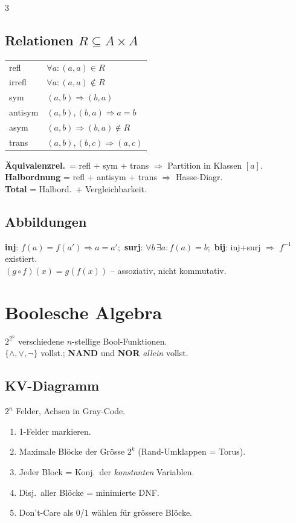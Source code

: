 \documentclass[8pt,a4paper]{extarticle}
\begin{document}
\begin{multicols*}{3}
\subsection{Relationen $R\subseteq A\times A$}
\begin{tabularx}{\linewidth}{@{}l@{\ }X@{}}
refl & $\forall a\!:(a,a)\!\in\!R$ \\
irrefl & $\forall a\!:(a,a)\!\notin\!R$ \\
sym & $(a,b)\!\Rightarrow\!(b,a)$ \\
antisym & $(a,b),(b,a)\!\Rightarrow\!a{=}b$ \\
asym & $(a,b)\!\Rightarrow\!(b,a)\!\notin\!R$ \\
trans & $(a,b),(b,c)\!\Rightarrow\!(a,c)$ \\
\end{tabularx}
\textbf{\"Aquivalenzrel.}\ = refl + sym + trans $\Rightarrow$ Partition in Klassen $[a]$.\\
\textbf{Halbordnung} = refl + antisym + trans $\Rightarrow$ Hasse-Diagr.\\
\textbf{Total} = Halbord.\ + Vergleichbarkeit.

\subsection{Abbildungen}
\textbf{inj}: $f(a){=}f(a'){\Rightarrow}a{=}a'$;\
\textbf{surj}: $\forall b\,\exists a\!:f(a){=}b$;\
\textbf{bij}: inj+surj $\Rightarrow$ $f^{-1}$ existiert.\\
$(g\circ f)(x){=}g(f(x))$ -- assoziativ, nicht kommutativ.

\section{Boolesche Algebra}
$2^{2^n}$ verschiedene $n$-stellige Bool-Funktionen.\\
$\{\wedge,\vee,\neg\}$ vollst.; \textbf{NAND} und \textbf{NOR} \emph{allein} vollst.

\subsection{KV-Diagramm}
$2^n$ Felder, Achsen in Gray-Code.
\begin{enumerate}
\item 1-Felder markieren.
\item Maximale Bl\"ocke der Gr\"osse $2^k$ (Rand-Umklappen = Torus).
\item Jeder Block = Konj.\ der \emph{konstanten} Variablen.
\item Disj.\ aller Bl\"ocke = minimierte DNF.
\item Don't-Care als $0$/$1$ w\"ahlen f\"ur gr\"ossere Bl\"ocke.
\end{enumerate}


\end{multicols*}
\end{document}
